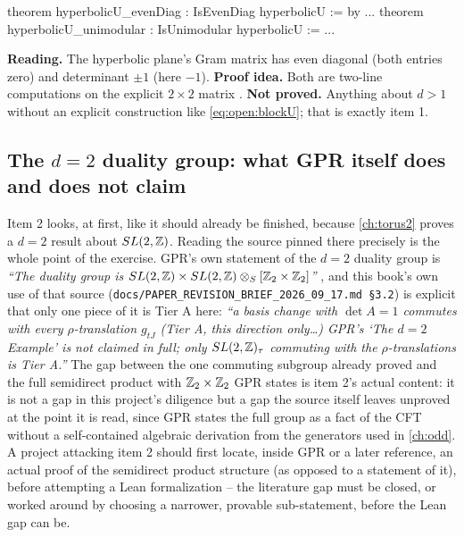\begin{leanbox}
\begin{leancode}
theorem hyperbolicU_evenDiag : IsEvenDiag hyperbolicU := by ...
theorem hyperbolicU_unimodular : IsUnimodular hyperbolicU := ...
\end{leancode}
\textbf{Reading.} The hyperbolic plane's Gram matrix has even diagonal (both entries
zero) and determinant $\pm1$ (here $-1$). \textbf{Proof idea.} Both are two-line
computations on the explicit $2\times2$ matrix . \textbf{Not proved.} Anything about $d>1$ without an explicit
construction like \eqref{eq:open:blockU}; that is exactly item 1. \TA
\end{leanbox}

\subsection{The $d=2$ duality group: what GPR itself does and does not claim}
\label{sec:open:duality-group}

Item 2 looks, at first, like it should already be finished, because \cref{ch:torus2}
proves a $d=2$ result about $SL(2,\mathbb{Z})$. Reading the source pinned there precisely is the whole
point of the exercise. GPR's own statement of the $d=2$ duality group is
\emph{``The duality group is $SL(2,\mathbb{Z})\times SL(2,\mathbb{Z})\otimes_S[\mathbb{Z}_2\times\mathbb{Z}_2]$''}
, and this book's own use of that source
(\texttt{docs/PAPER\_REVISION\_BRIEF\_2026\_09\_17.md §3.2}) is explicit that only one
piece of it is Tier A here: \emph{``a basis change with $\det A=1$ commutes with every
$\rho$-translation $g_{tJ}$ (Tier A, this direction only\ldots)\; GPR's `The $d=2$ Example'
is not claimed in full; only $SL(2,\mathbb{Z})_\tau$ commuting with the $\rho$-translations is Tier
A.''} The gap between the one commuting subgroup already proved and the full semidirect
product with $\mathbb{Z}_2\times\mathbb{Z}_2$ GPR states is item 2's actual content: it is not a gap in
this project's diligence but a gap the source itself leaves unproved at the point it is
read, since GPR states the full group as a fact of the CFT without a self-contained
algebraic derivation from the generators used in \cref{ch:odd}. A project attacking item 2
should first locate, inside GPR or a later reference, an actual proof of the semidirect
product structure (as opposed to a statement of it), before attempting a Lean
formalization -- the literature gap must be closed, or worked around by choosing a
narrower, provable sub-statement, before the Lean gap can be.

